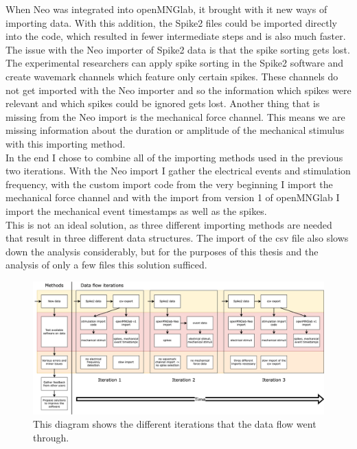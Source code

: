 When Neo was integrated into openMNGlab, it brought with it new ways of importing data. With this addition, the Spike2 files could be imported directly into the code, which resulted in fewer intermediate steps and is also much faster. The issue with the Neo importer of Spike2 data is that the spike sorting gets lost. The experimental researchers can apply spike sorting in the Spike2 software and create wavemark channels which feature only certain spikes. These channels do not get imported with the Neo importer and so the information which spikes were relevant and which spikes could be ignored gets lost. Another thing that is missing from the Neo import is the mechanical force channel. This means we are missing information about the duration or amplitude of the mechanical stimulus with this importing method.\\
In the end I chose to combine all of the importing methods used in the previous two iterations. With the Neo import I gather the electrical events and stimulation frequency, with the custom import code from the very beginning I import the mechanical force channel and with the import from version 1 of openMNGlab I import the mechanical event timestamps as well as the spikes. \\
This is not an ideal solution, as three different importing methods are needed that result in three different data structures. The import of the csv file also slows down the analysis considerably, but for the purposes of this thesis and the analysis of only a few files this solution sufficed.
\begin{figure}
	\includegraphics[width = \textwidth]{src/pic/Data_flow_iteration}
	\caption{This diagram shows the different iterations that the data flow went through.}
	\label{fig:import_iteration}
\end{figure}

